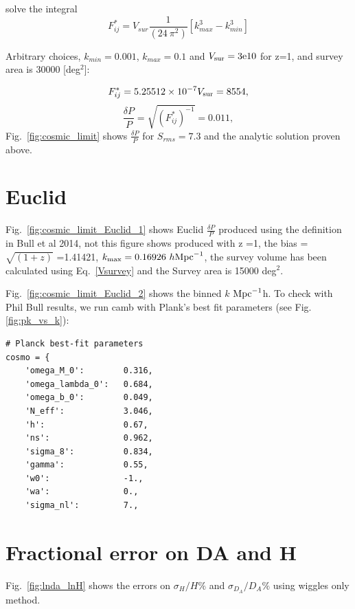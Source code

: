 \documentclass[10pt,a4paper]{article}
\begin{document}
solve the integral 
\begin{equation}\label{dp_ov_p}
F_{ij}^*= V_{sur} \frac{1}{ (24 \ \pi^2 )} \left[ k_{max}^3 -k_{min} ^3 \right]
\end{equation}

Arbitrary choices, $k_{min} = 0.001$, $k_{max} = 0.1$ and $V_{\rm sur} = 3{\rm e}10$ for z=1, and survey area is 30000 [deg$^2$]:

\begin{equation}
F_{ij}^* = 5.25512 \times 10^{-7}  V_{\rm sur}   = 8554,
\end{equation}
\begin{equation}
\frac{\delta P}{P} = \sqrt{(F_{ij}^*)^{-1}} = 0.011,
\end{equation}
Fig.~\ref{fig:cosmic_limit} shows $\frac{\delta P}{P}$ for $S_{rms} = 7.3$ and  the analytic solution proven above.
\section{Euclid}

 Fig.~\ref{fig:cosmic_limit_Euclid_1} shows Euclid $\frac{\delta P}{P}$ produced using the definition in Bull et al 2014, not this figure shows produced with z =1, the bias = $ \sqrt{(1+z)}$ =1.41421, $k_{\rm max} = 0.16926\  h {\rm Mpc}^{-1}$, the survey volume has been calculated using Eq.~\ref{Vsurvey} and the Survey area is 15000 deg$^2$.



Fig.~\ref{fig:cosmic_limit_Euclid_2} shows the binned $k$ $\rm{Mpc}^{-1}$h. To check with Phil Bull results, we run camb with Plank's best fit parameters (see Fig.~ \ref{fig:pk_vs_k}):

\begin{verbatim}
# Planck best-fit parameters
cosmo = {
    'omega_M_0':        0.316,
    'omega_lambda_0':   0.684,
    'omega_b_0':        0.049,
    'N_eff':            3.046,
    'h':                0.67,
    'ns':               0.962,
    'sigma_8':          0.834,
    'gamma':            0.55,
    'w0':               -1.,
    'wa':               0.,
    'sigma_nl':         7.,
\end{verbatim}

\section{Fractional error on DA and H}
Fig.~\ref{fig:lnda_lnH} shows the errors on $\sigma_H/H \%$ and  $\sigma_{D_A}/D_A \%$ using wiggles only method.
\end{document}
